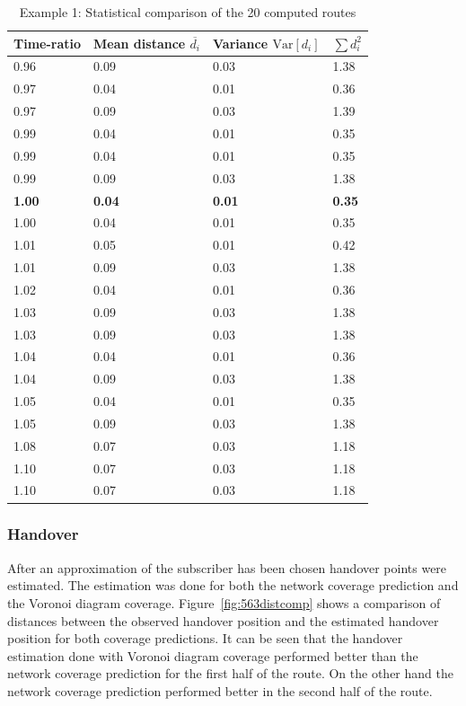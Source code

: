 \begin{table}
\centering
\begin{tabular}{l|l|l|l}
Time-ratio & Mean distance $\overline{d_i}$ & Variance $\mathrm{Var}[d_i]$& $\sum {d}_{i}^{2}$ \\
\hline
0.96 & 0.09 & 0.03 & 1.38 \\
0.97 & 0.04 & 0.01 & 0.36 \\
0.97 & 0.09 & 0.03 & 1.39 \\
0.99 & 0.04 & 0.01 & 0.35 \\
0.99 & 0.04 & 0.01 & 0.35 \\
0.99 & 0.09 & 0.03 & 1.38 \\
\textbf{1.00} & \textbf{0.04 }& \textbf{0.01} & \textbf{0.35} \\
1.00 & 0.04 & 0.01 & 0.35 \\
1.01 & 0.05 & 0.01 & 0.42 \\
1.01 & 0.09 & 0.03 & 1.38 \\
1.02 & 0.04 & 0.01 & 0.36 \\
1.03 & 0.09 & 0.03 & 1.38 \\
1.03 & 0.09 & 0.03 & 1.38 \\
1.04 & 0.04 & 0.01 & 0.36 \\
1.04 & 0.09 & 0.03 & 1.38 \\
1.05 & 0.04 & 0.01 & 0.35 \\
1.05 & 0.09 & 0.03 & 1.38 \\
1.08 & 0.07 & 0.03 & 1.18 \\
1.10 & 0.07 & 0.03 & 1.18 \\
1.10 & 0.07 & 0.03 & 1.18
\end{tabular}
\caption{Example 1:  Statistical comparison of the 20 computed routes}
\label{tab:563route}
\end{table}
\subsubsection{Handover}
After an approximation of the subscriber has been chosen handover points were estimated. The estimation was done for both the network coverage prediction and the Voronoi diagram coverage. Figure~\ref{fig:563distcomp} shows a comparison of distances between the observed handover position and the estimated handover position for both coverage predictions. It can be seen that the handover estimation done with Voronoi diagram coverage performed better than the network coverage prediction for the first half of the route. On the other hand the network coverage prediction performed better in the second half of the route.
